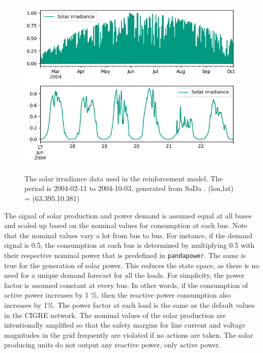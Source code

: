 \documentclass[class=book, crop=false, 11pt]{standalone}
\begin{document}
\begin{figure}[ht]
    \center
    \includegraphics[height=9cm, width=13.5cm]{figures/solar_data.png}
    \caption  {The solar irradiance data used in the reinforcement model. The period is 2004-02-11 to 2004-10-03, generated from SoDa \cite{solar_data}. (lon,lat) = (63.395,10.381) }
    \label{fig:problem:solar_data}
\end{figure}


The signal of solar production and power demand is assumed equal at all buses and scaled up based on the nominal values for consumption at each bus. Note that the nominal values vary a lot from bus to bus. For instance, if the demand signal is 0.5, the consumption at each bus is determined by multiplying 0.5 with their respective nominal power that is predefined in \texttt{pandapower}. The same is true for the generation of solar power. This reduces the state space, as there is no need for a unique demand forecast for all the loads.  For simplicity, the power factor is assumed constant at every bus. In other words, if the consumption of active power increases by 1 \%, then the reactive power consumption also increases by 1\%. The power factor at each load is the same as the default values in the CIGRE network. The nominal values of the solar production are intentionally amplified so that the safety margins for line current and voltage magnitudes in the grid frequently are violated if no actions are taken. The solar producing units do not output any reactive power, only active power.
\end{document}
